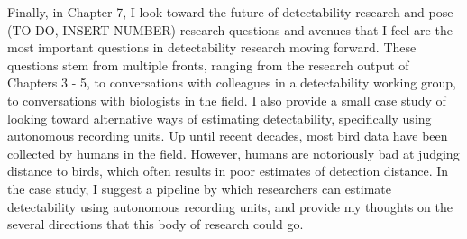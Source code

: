 \par Finally, in Chapter 7, I look toward the future of detectability research and pose (TO DO, INSERT NUMBER) research questions and avenues that I feel are the most important questions in detectability research moving forward.
These questions stem from multiple fronts, ranging from the research output of Chapters 3 - 5, to conversations with colleagues in a detectability working group, to conversations with biologists in the field.
I also provide a small case study of looking toward alternative ways of estimating detectability, specifically using autonomous recording units.
Up until recent decades, most bird data have been collected by humans in the field.
However, humans are notoriously bad at judging distance to birds, which often results in poor estimates of detection distance.
In the case study, I suggest a pipeline by which researchers can estimate detectability using autonomous recording units, and provide my thoughts on the several directions that this body of research could go.

